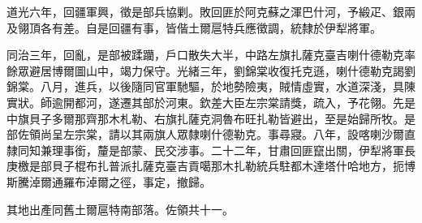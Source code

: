 \begin{pinyinscope}
道光六年，回疆軍興，徵是部兵協剿。敗回匪於阿克蘇之渾巴什河，予緞疋、銀兩及翎頂各有差。自是回疆有事，皆偕土爾扈特兵應徵調，統隸於伊犁將軍。

同治三年，回亂，是部被蹂躪，戶口散失大半，中路左旗扎薩克臺吉喇什德勒克率餘眾避居博爾圖山中，竭力保守。光緒三年，劉錦棠收復托克遜，喇什德勒克謁劉錦棠。八月，進兵，以後隨同官軍馳驅，於地勢險夷，賊情虛實，水道深淺，具陳實狀。師逾開都河，遂遷其部於河東。欽差大臣左宗棠請獎，疏入，予花翎。先是中旗貝子多爾那齊那木札勒、右旗扎薩克洞魯布旺扎勒皆避出，至是始歸所牧。是部佐領尚呈左宗棠，請以其兩旗人眾隸喇什德勒克。事尋寢。八年，設喀喇沙爾直隸同知兼理事銜，釐是部蒙、民交涉事。二十二年，甘肅回匪竄出關，伊犁將軍長庚檄是部貝子棍布扎普派扎薩克臺吉貢噶那木扎勒統兵駐都木達塔什哈地方，扼博斯騰淖爾通羅布淖爾之徑，事定，撤歸。

其地出產同舊土爾扈特南部落。佐領共十一。


\end{pinyinscope}